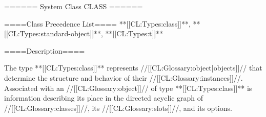 ====== System Class CLASS ======

====Class Precedence List==== **[[CL:Types:class]]**, **[[CL:Types:standard-object]]**, **[[CL:Types:t]]**

====Description====

The type **[[CL:Types:class]]** represents //[[CL:Glossary:object|objects]]// that determine the structure and behavior of their //[[CL:Glossary:instances]]//. Associated with an //[[CL:Glossary:object]]// of type **[[CL:Types:class]]** is information describing its place in the directed acyclic graph of //[[CL:Glossary:classes]]//, its //[[CL:Glossary:slots]]//, and its options.

 
